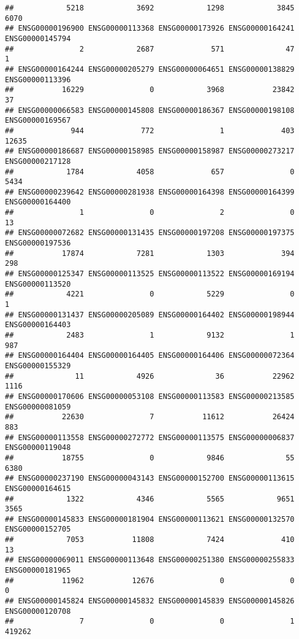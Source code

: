 \documentclass[
]{article}
\begin{document}
\begin{verbatim}
##            5218            3692            1298            3845            6070 
## ENSG00000196900 ENSG00000113368 ENSG00000173926 ENSG00000164241 ENSG00000145794 
##               2            2687             571              47               1 
## ENSG00000164244 ENSG00000205279 ENSG00000064651 ENSG00000138829 ENSG00000113396 
##           16229               0            3968           23842              37 
## ENSG00000066583 ENSG00000145808 ENSG00000186367 ENSG00000198108 ENSG00000169567 
##             944             772               1             403           12635 
## ENSG00000186687 ENSG00000158985 ENSG00000158987 ENSG00000273217 ENSG00000217128 
##            1784            4058             657               0            5434 
## ENSG00000239642 ENSG00000281938 ENSG00000164398 ENSG00000164399 ENSG00000164400 
##               1               0               2               0              13 
## ENSG00000072682 ENSG00000131435 ENSG00000197208 ENSG00000197375 ENSG00000197536 
##           17874            7281            1303             394             298 
## ENSG00000125347 ENSG00000113525 ENSG00000113522 ENSG00000169194 ENSG00000113520 
##            4221               0            5229               0               1 
## ENSG00000131437 ENSG00000205089 ENSG00000164402 ENSG00000198944 ENSG00000164403 
##            2483               1            9132               1             987 
## ENSG00000164404 ENSG00000164405 ENSG00000164406 ENSG00000072364 ENSG00000155329 
##              11            4926              36           22962            1116 
## ENSG00000170606 ENSG00000053108 ENSG00000113583 ENSG00000213585 ENSG00000081059 
##           22630               7           11612           26424             883 
## ENSG00000113558 ENSG00000272772 ENSG00000113575 ENSG00000006837 ENSG00000119048 
##           18755               0            9846              55            6380 
## ENSG00000237190 ENSG00000043143 ENSG00000152700 ENSG00000113615 ENSG00000164615 
##            1322            4346            5565            9651            3565 
## ENSG00000145833 ENSG00000181904 ENSG00000113621 ENSG00000132570 ENSG00000152705 
##            7053           11808            7424             410              13 
## ENSG00000069011 ENSG00000113648 ENSG00000251380 ENSG00000255833 ENSG00000181965 
##           11962           12676               0               0               0 
## ENSG00000145824 ENSG00000145832 ENSG00000145839 ENSG00000145826 ENSG00000120708 
##               7               0               0               1          419262 

\end{verbatim}
\end{document}
